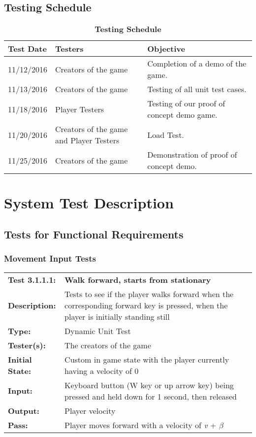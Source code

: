 \documentclass[12pt, titlepage]{article}
\begin{document}
\subsection{Testing Schedule}
\begin{table}[ht]
\caption{\textbf{Testing Schedule}} \label{Table}
\begin{tabularx}{\textwidth}{p{3cm}p{2cm}X}
\toprule
\textbf{Test Date} & \textbf{Testers} & \textbf{Objective} \\
\midrule
11/12/2016 & Creators of the game & Completion of a demo of the game. \\
11/13/2016 & Creators of the game & Testing of all unit test cases. \\
11/18/2016 & Player Testers & Testing of our proof of concept demo game. \\
11/20/2016 & Creators of the game and Player Testers & Load Test.\\
11/25/2016 & Creators of the game & Demonstration of proof of concept demo.\\
\bottomrule
\end{tabularx}
\end{table}
\section{System Test Description}
	
\subsection{Tests for Functional Requirements}
\subsubsection{Movement Input Tests}

\begin{mdframed}[linewidth=1pt]
\begin{tabularx}{\textwidth}{@{}p{3cm}X@{}}
{\bf Test 3.1.1.1:} & {\bf Walk forward, starts from stationary}\\[\baselineskip]
{\bf Description:} & Tests to see if the player walks forward when the corresponding forward key is pressed, when the player is initially standing still\\[0.5\baselineskip]
{\bf Type:} & Dynamic Unit Test\\[0.5\baselineskip]
{\bf Tester(s):} & The creators of the game\\[0.5\baselineskip]
{\bf Initial State:} & Custom in game state with the player currently having a velocity of 0\\[0.5\baselineskip]
{\bf Input:} & Keyboard button (W key or up arrow key) being pressed and held down for 1 second, then released\\[0.5\baselineskip]
{\bf Output:} & Player velocity\\[0.5\baselineskip]
{\bf Pass:} & Player moves forward with a velocity of \textit{v} + $\beta$
\end{tabularx}
\end{mdframed}
					
\end{document}
